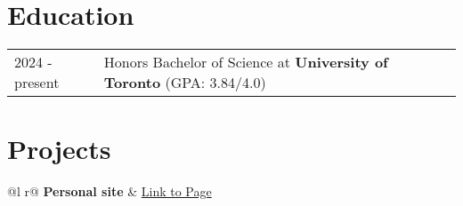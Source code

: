 \documentclass[a4paper,10pt]{article} %
\begin{document}
    \section{Education}
    \begin{tabularx}{\linewidth}{@{}l X@{}}
        2024 - present & Honors Bachelor of Science at \textbf{University of Toronto} \hfill \normalsize (GPA: 3.84/4.0) \\
    \end{tabularx}


    \section{Projects}

    \begin{tabularx}{\linewidth}{ @{}l r@{} }
        \textbf{Personal site} & \hfill \href{https://frtheatelier.github.io/dashboard/}{Link to Page} \\[3.75pt]
          \\
    \end{tabularx}
\end{document}
